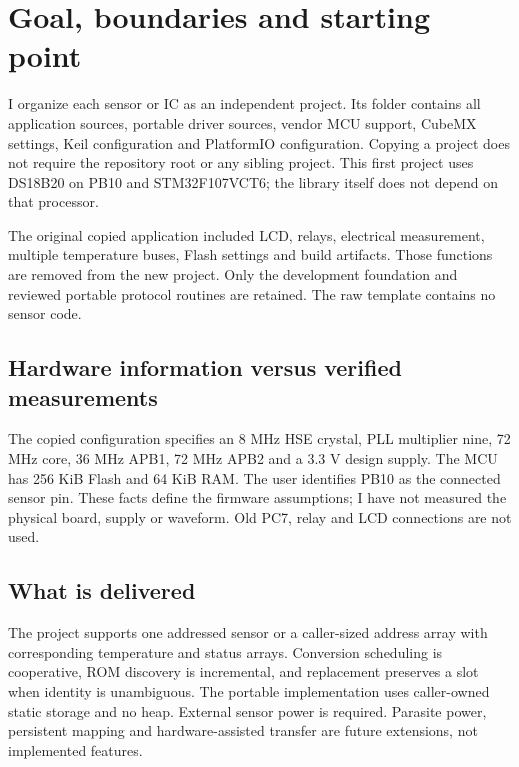 \section{Goal, boundaries and starting point}
I organize each sensor or IC as an independent project. Its folder contains all
application sources, portable driver sources, vendor MCU support, CubeMX settings,
Keil configuration and PlatformIO configuration. Copying a project does not require
the repository root or any sibling project. This first project uses DS18B20 on PB10
and STM32F107VCT6; the library itself does not depend on that processor.

The original copied application included LCD, relays, electrical measurement,
multiple temperature buses, Flash settings and build artifacts. Those functions
are removed from the new project. Only the development foundation and reviewed
portable protocol routines are retained. The raw template contains no sensor code.

\subsection{Hardware information versus verified measurements}
The copied configuration specifies an 8 MHz HSE crystal, PLL multiplier nine,
72 MHz core, 36 MHz APB1, 72 MHz APB2 and a 3.3 V design supply. The MCU has
256 KiB Flash and 64 KiB RAM\cite{stm32}. The user identifies PB10 as the connected
sensor pin. These facts define the firmware assumptions; I have not measured the
physical board, supply or waveform. Old PC7, relay and LCD connections are not used.

\subsection{What is delivered}
The project supports one addressed sensor or a caller-sized address array with
corresponding temperature and status arrays. Conversion scheduling is cooperative,
ROM discovery is incremental, and replacement preserves a slot when identity is
unambiguous. The portable implementation uses caller-owned static storage and no
heap. External sensor power is required. Parasite power, persistent mapping and
hardware-assisted transfer are future extensions, not implemented features.
